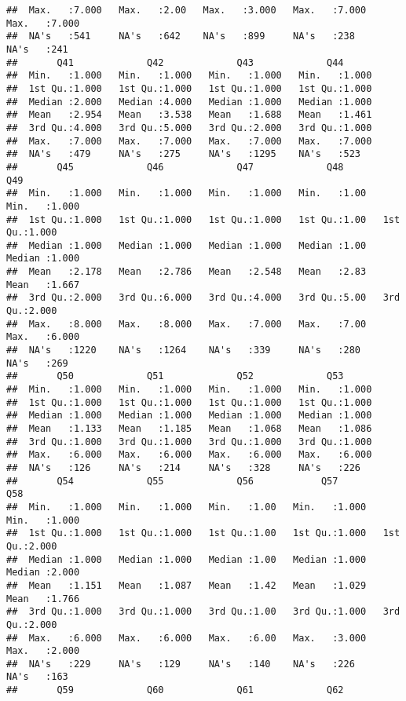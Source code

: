 \documentclass[
]{article}
\begin{document}
\begin{verbatim}
##  Max.   :7.000   Max.   :2.00   Max.   :3.000   Max.   :7.000   Max.   :7.000  
##  NA's   :541     NA's   :642    NA's   :899     NA's   :238     NA's   :241    
##       Q41             Q42             Q43             Q44       
##  Min.   :1.000   Min.   :1.000   Min.   :1.000   Min.   :1.000  
##  1st Qu.:1.000   1st Qu.:1.000   1st Qu.:1.000   1st Qu.:1.000  
##  Median :2.000   Median :4.000   Median :1.000   Median :1.000  
##  Mean   :2.954   Mean   :3.538   Mean   :1.688   Mean   :1.461  
##  3rd Qu.:4.000   3rd Qu.:5.000   3rd Qu.:2.000   3rd Qu.:1.000  
##  Max.   :7.000   Max.   :7.000   Max.   :7.000   Max.   :7.000  
##  NA's   :479     NA's   :275     NA's   :1295    NA's   :523    
##       Q45             Q46             Q47             Q48            Q49       
##  Min.   :1.000   Min.   :1.000   Min.   :1.000   Min.   :1.00   Min.   :1.000  
##  1st Qu.:1.000   1st Qu.:1.000   1st Qu.:1.000   1st Qu.:1.00   1st Qu.:1.000  
##  Median :1.000   Median :1.000   Median :1.000   Median :1.00   Median :1.000  
##  Mean   :2.178   Mean   :2.786   Mean   :2.548   Mean   :2.83   Mean   :1.667  
##  3rd Qu.:2.000   3rd Qu.:6.000   3rd Qu.:4.000   3rd Qu.:5.00   3rd Qu.:2.000  
##  Max.   :8.000   Max.   :8.000   Max.   :7.000   Max.   :7.00   Max.   :6.000  
##  NA's   :1220    NA's   :1264    NA's   :339     NA's   :280    NA's   :269    
##       Q50             Q51             Q52             Q53       
##  Min.   :1.000   Min.   :1.000   Min.   :1.000   Min.   :1.000  
##  1st Qu.:1.000   1st Qu.:1.000   1st Qu.:1.000   1st Qu.:1.000  
##  Median :1.000   Median :1.000   Median :1.000   Median :1.000  
##  Mean   :1.133   Mean   :1.185   Mean   :1.068   Mean   :1.086  
##  3rd Qu.:1.000   3rd Qu.:1.000   3rd Qu.:1.000   3rd Qu.:1.000  
##  Max.   :6.000   Max.   :6.000   Max.   :6.000   Max.   :6.000  
##  NA's   :126     NA's   :214     NA's   :328     NA's   :226    
##       Q54             Q55             Q56            Q57             Q58       
##  Min.   :1.000   Min.   :1.000   Min.   :1.00   Min.   :1.000   Min.   :1.000  
##  1st Qu.:1.000   1st Qu.:1.000   1st Qu.:1.00   1st Qu.:1.000   1st Qu.:2.000  
##  Median :1.000   Median :1.000   Median :1.00   Median :1.000   Median :2.000  
##  Mean   :1.151   Mean   :1.087   Mean   :1.42   Mean   :1.029   Mean   :1.766  
##  3rd Qu.:1.000   3rd Qu.:1.000   3rd Qu.:1.00   3rd Qu.:1.000   3rd Qu.:2.000  
##  Max.   :6.000   Max.   :6.000   Max.   :6.00   Max.   :3.000   Max.   :2.000  
##  NA's   :229     NA's   :129     NA's   :140    NA's   :226     NA's   :163    
##       Q59             Q60             Q61             Q62       

\end{verbatim}
\end{document}
